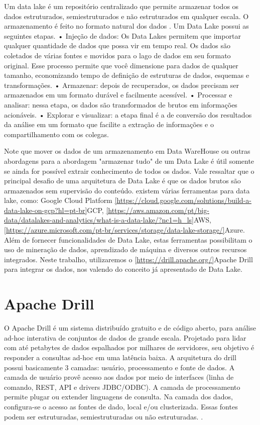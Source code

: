 Um data lake é um repositório centralizado que permite armazenar todos os  dados estruturados, semiestruturados e não estruturados em qualquer escala. O armazenamento é feito no formato natural dos dados \cite{laskowski2016data}.
Um Data Lake possui as seguintes etapas.
• Injeção de dados: Os Data Lakes permitem que importar qualquer quantidade de dados que possa vir em tempo real. Os dados são coletados de várias fontes e movidos para o lago de dados em seu formato original. Esse processo permite que você dimensione para dados de qualquer tamanho, economizando tempo de definição de estruturas de dados, esquemas e transformações.
• Armazenar: depois de recuperados, os dados precisam ser armazenados em um formato durável e facilmente acessível.
• Processar e analisar: nessa etapa, os dados são transformados de brutos em informações acionáveis.
• Explorar e visualizar: a etapa final é a de conversão dos resultados da análise em um formato que facilite a extração de informações e o compartilhamento com os colegas.

Note que mover os dados de um armazenamento em Data WareHouse ou outras abordagens para a abordagem "armazenar tudo" de um  Data Lake é útil somente se ainda for possível extrair conhecimento de todos os dados.
Vale ressaltar que o principal desafio de uma arquitetura de Data Lake é que os dados brutos são armazenados sem supervisão do conteúdo.
existem várias ferramentas para data lake, como: Google Cloud Platform \ref{https://cloud.google.com/solutions/build-a-data-lake-on-gcp?hl=pt-br}{GCP}, \ref{https://aws.amazon.com/pt/big-data/datalakes-and-analytics/what-is-a-data-lake/?nc1=h_ls}{AWS}, \ref{https://azure.microsoft.com/pt-br/services/storage/data-lake-storage/}{Azure}.  Além de fornecer funcionalidades de Data Lake, estas ferramentas possibilitam o uso de mineração de dados, aprendizado de máquina e diversos outros recursos integrados.
Neste trabalho, utilizaremos o \ref{https://drill.apache.org/}{Apache Drill} para integrar os dados, nos valendo do conceito já apresentado de Data Lake.

\section{Apache Drill}

O Apache Drill é um sistema distribuído gratuito e de código aberto, para análise ad-hoc interativa de conjuntos de dados de grande escala. Projetado para lidar com até
petabytes de dados espalhados por milhares de servidores, seu objetivo é responder a consultas ad-hoc em uma latência baixa.
A arquitetura do drill possui basicamente 3 camadas: usuário, processamento e fonte de dados.
A camada de usuário provê acesso aos dados por meio de interfaces (linha de comando, REST, API e drivers JDBC/ODBC). A camada de processamento permite plugar ou extender linguagens de consulta. Na camada dos dados, configura-se  o acesso as fontes de dado, local e/ou clusterizada. Essas fontes podem ser estruturadas, semiestruturadas ou não estruturadas. \cite{hausenblas2013apache}.
